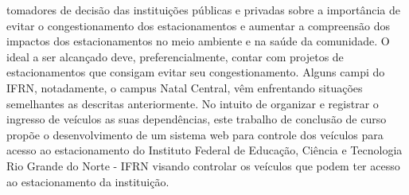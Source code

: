 tomadores de decisão das instituições públicas e privadas sobre a importância de evitar o congestionamento dos estacionamentos e aumentar a compreensão dos impactos dos estacionamentos no meio ambiente e na saúde da comunidade. O ideal a ser alcançado deve, preferencialmente, contar com projetos de estacionamentos que consigam evitar seu congestionamento. Alguns campi do IFRN, notadamente, o campus Natal Central, vêm enfrentando situações semelhantes as descritas anteriormente. No intuito de organizar e registrar o ingresso de veículos as suas  dependências, este trabalho de conclusão de curso propõe o desenvolvimento de um sistema web para controle dos veículos para acesso ao estacionamento do Instituto Federal de Educação, Ciência e Tecnologia Rio Grande do Norte - IFRN visando controlar os veículos que podem ter acesso ao estacionamento da instituição.   





